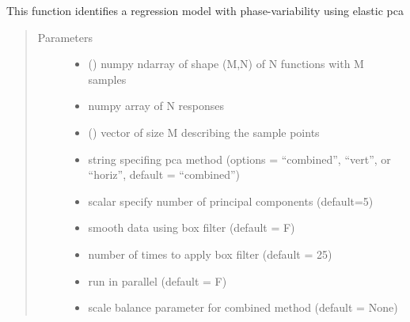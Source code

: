\documentclass[letterpaper,10pt,english]{sphinxmanual}
\begin{document}
\begin{fulllineitems}
\label{\detokenize{pcr_regression:pcr_regression.elastic_pcr_regression}}
This function identifies a regression model with phase-variability
using elastic pca
\begin{quote}\begin{description}
\item[{Parameters}] \leavevmode\begin{itemize}
\item {} 
 () \textendash{} numpy ndarray of shape (M,N) of N functions with M samples

\item {} 
 \textendash{} numpy array of N responses

\item {} 
 () \textendash{} vector of size M describing the sample points

\item {} 
 \textendash{} string specifing pca method (options = “combined”,
“vert”, or “horiz”, default = “combined”)

\item {} 
 \textendash{} scalar specify number of principal components (default=5)

\item {} 
 \textendash{} smooth data using box filter (default = F)

\item {} 
 \textendash{} number of times to apply box filter (default = 25)

\item {} 
 \textendash{} run in parallel (default = F)

\item {} 
 \textendash{} scale balance parameter for combined method (default = None)


\end{itemize}
\end{description}
\end{quote}
\end{fulllineitems}
\end{document}
